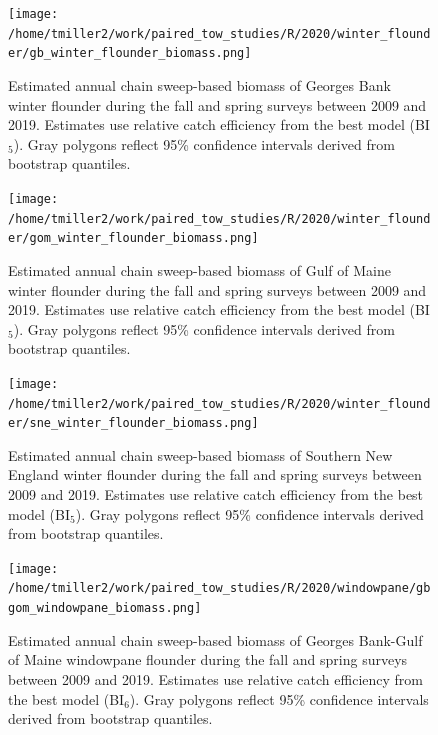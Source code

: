 \documentclass[12pt,letterpaper, leqno]{article}
\begin{document}
\begin{figure}
\caption{Estimated annual chain sweep-based biomass of Georges Bank winter flounder during the fall and spring surveys between 2009 and 2019. Estimates use relative catch efficiency from the best model (BI$_5$). Gray polygons reflect 95\% confidence intervals derived from bootstrap quantiles.}\label{gb_winter_flounder_biomass}
\begin{center}
\texttt{[image: /home/tmiller2/work/paired\_tow\_studies/R/2020/winter\_flounder/gb\_winter\_flounder\_biomass.png]}
\end{center}
\end{figure}

\begin{figure}
\caption{Estimated annual chain sweep-based biomass of Gulf of Maine winter flounder during the fall and spring surveys between 2009 and 2019. Estimates use relative catch efficiency from the best model (BI$_5$). Gray polygons reflect 95\% confidence intervals derived from bootstrap quantiles.}\label{gom_winter_flounder_biomass}
\begin{center}
\texttt{[image: /home/tmiller2/work/paired\_tow\_studies/R/2020/winter\_flounder/gom\_winter\_flounder\_biomass.png]}
\end{center}
\end{figure}

\begin{figure}
\caption{Estimated annual chain sweep-based biomass of Southern New England winter flounder during the fall and spring surveys between 2009 and 2019. Estimates use relative catch efficiency from the best model (BI$_5$). Gray polygons reflect 95\% confidence intervals derived from bootstrap quantiles.}\label{sne_winter_flounder_biomass}
\begin{center}
\texttt{[image: /home/tmiller2/work/paired\_tow\_studies/R/2020/winter\_flounder/sne\_winter\_flounder\_biomass.png]}
\end{center}
\end{figure}

\begin{figure}
\caption{Estimated annual chain sweep-based biomass of Georges Bank-Gulf of Maine windowpane flounder during the fall and spring surveys between 2009 and 2019. Estimates use relative catch efficiency from the best model (BI$_6$). Gray polygons reflect 95\% confidence intervals derived from bootstrap quantiles.}\label{gbgom_windowpane_biomass}
\begin{center}
\texttt{[image: /home/tmiller2/work/paired\_tow\_studies/R/2020/windowpane/gbgom\_windowpane\_biomass.png]}
\end{center}
\end{figure}
\end{document}
